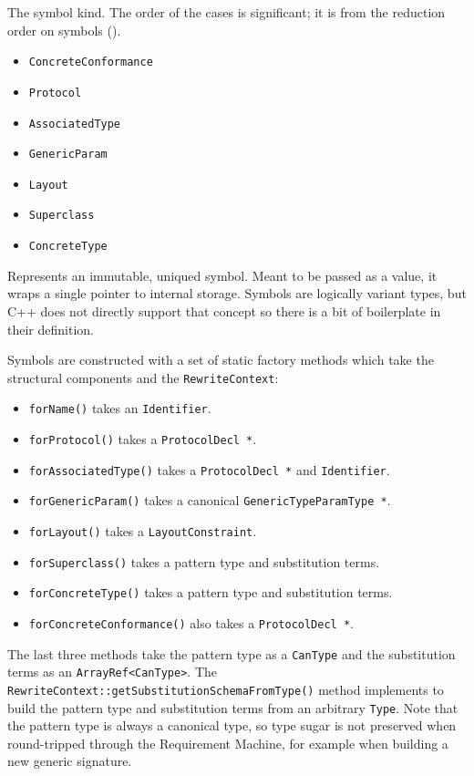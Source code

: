 \documentclass[../generics]{subfiles}
\begin{document}

The symbol kind. The order of the cases is significant; it is from the reduction order on symbols ().
\begin{itemize}
\item \texttt{ConcreteConformance}
\item \texttt{Protocol}
\item \texttt{AssociatedType}
\item \texttt{GenericParam}
\item \texttt{Layout}
\item \texttt{Superclass}
\item \texttt{ConcreteType}
\end{itemize}

Represents an immutable, uniqued symbol. Meant to be passed as a value, it wraps a single pointer to internal storage. Symbols are logically variant types, but C++ does not directly support that concept so there is a bit of boilerplate in their definition.

Symbols are constructed with a set of static factory methods which take the structural components and the \texttt{RewriteContext}:
\begin{itemize}
\item \texttt{forName()} takes an \texttt{Identifier}.
\item \texttt{forProtocol()} takes a \texttt{ProtocolDecl *}.
\item \texttt{forAssociatedType()} takes a \texttt{ProtocolDecl *} and \texttt{Identifier}.
\item \texttt{forGenericParam()} takes a canonical \texttt{GenericTypeParamType *}.
\item \texttt{forLayout()} takes a \texttt{LayoutConstraint}.
\item \texttt{forSuperclass()} takes a pattern type and substitution terms.
\item \texttt{forConcreteType()} takes a pattern type and substitution terms.
\item \texttt{forConcreteConformance()} also takes a \texttt{ProtocolDecl *}.
\end{itemize}
The last three methods take the pattern type as a \texttt{CanType} and the substitution terms as an \texttt{ArrayRef<CanType>}. The \texttt{RewriteContext::getSubstitutionSchemaFromType()} method implements  to build the pattern type and substitution terms from an arbitrary \texttt{Type}. Note that the pattern type is always a canonical type, so type sugar is not preserved when round-tripped through the Requirement Machine, for example when building a new generic signature.
\end{document}
